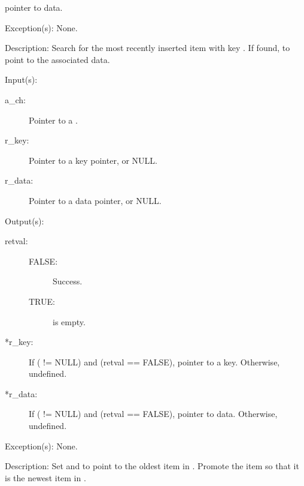 \begin{capi}
\begin{capilist}
\begin{description}
			pointer to data.
		\end{description}
	\item[Exception(s): ] None.
	\item[Description: ]
		Search for the most recently inserted item with key
		.  If found,  to point to the
		associated data.
	\end{capilist}
\label{ch_get_iterate}
	\begin{capilist}
	\item[Input(s): ]
		\begin{description}\item[]
		\item[a\_ch: ]
			Pointer to a .
		\item[r\_key: ]
			Pointer to a key pointer, or NULL.
		\item[r\_data: ]
			Pointer to a data pointer, or NULL.
		\end{description}
	\item[Output(s): ]
		\begin{description}\item[]
		\item[retval: ]
			\begin{description}\item[]
			\item[FALSE: ]
				Success.
			\item[TRUE: ]
				 is empty.
			\end{description}
		\item[*r\_key: ]
			If ( != NULL) and (retval == FALSE),
			pointer to a key.  Otherwise, undefined.
		\item[*r\_data: ]
			If ( != NULL) and (retval == FALSE),
			pointer to data.  Otherwise, undefined.
		\end{description}
	\item[Exception(s): ] None.
	\item[Description: ]
		Set  and  to point to the oldest
		item in .  Promote the item so that it is the newest
		item in .
	\end{capilist}
\label{ch_remove_iterate}
	\begin{capilist}

\end{capilist}
\end{capi}
